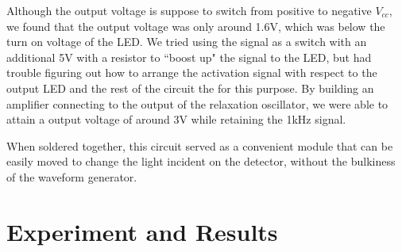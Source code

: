 \documentclass[twocolumn]{article}
\begin{document}
\par Although the output voltage is suppose to switch from positive to negative $V_{cc}$, we found that the output voltage was only around 1.6V, which was below the turn on voltage of the LED. We tried using the signal as a switch with an additional 5V with a resistor to ``boost up" the signal to the LED, but had trouble figuring out how to arrange the activation signal with respect to the output LED and the rest of the circuit the for this purpose. By building an amplifier connecting to the output of the relaxation oscillator, we were able to attain a output voltage of around 3V while retaining the 1kHz signal.
\par When soldered together, this circuit served as a convenient module that can be easily moved to change the light incident on the detector, without the bulkiness of the waveform generator.


\section{Experiment and Results}
\end{document}
